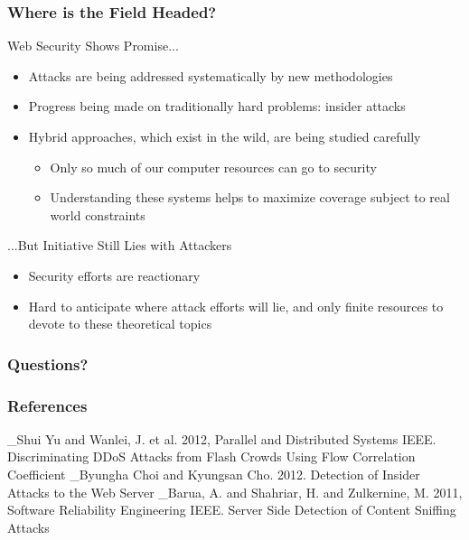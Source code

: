 \documentclass[10pt,mathserif]{beamer}
\begin{document}
\begin{frame}
  \frametitle{Where is the Field Headed?} %
  \begin{block}{Web Security Shows Promise...}
    \begin{itemize}
      \item Attacks are being addressed systematically by new methodologies
      \item Progress being made on traditionally hard problems:
        insider attacks
      \item Hybrid approaches, which exist in the wild, are being
        studied carefully
        \begin{itemize}
          \item Only so much of our computer resources can go to security
          \item Understanding these systems helps to maximize
            coverage subject to real world constraints
        \end{itemize}
    \end{itemize}
  \end{block}
  \begin{block}{...But Initiative Still Lies with Attackers}
    \begin{itemize}
      \item Security efforts are reactionary
      \item Hard to anticipate where attack efforts will lie, and only
        finite resources to devote to these theoretical topics
    \end{itemize}
  \end{block}
\end{frame}

\begin{frame}
  \frametitle{Questions?}
\end{frame}

\begin{frame}
  \frametitle{References}
  \begin{thebibliography}{}
   _Shui Yu and Wanlei, J. et al. 2012, Parallel and
    Distributed Systems IEEE. Discriminating DDoS Attacks from Flash
    Crowds Using Flow Correlation Coefficient
   _Byungha Choi and Kyungsan
    Cho. 2012. Detection of Insider Attacks to the Web Server
   _Barua,
    A. and Shahriar, H. and Zulkernine, M. 2011, Software Reliability
    Engineering IEEE. Server Side Detection of Content Sniffing Attacks
  \end{thebibliography}
\end{frame}
\end{document}
